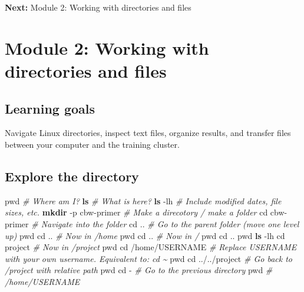 \documentclass[
]{book}
\newenvironment{Shaded}{\begin{snugshade}}{\end{snugshade}}
\newcommand{\AttributeTok}[1]{\textcolor[rgb]{0.13,0.29,0.53}{#1}}
\newcommand{\BuiltInTok}[1]{#1}
\newcommand{\CommentTok}[1]{\textcolor[rgb]{0.56,0.35,0.01}{\textit{#1}}}
\newcommand{\FunctionTok}[1]{\textcolor[rgb]{0.13,0.29,0.53}{\textbf{#1}}}
\newcommand{\NormalTok}[1]{#1}
\begin{document}
\textbf{Next:} Module 2: Working with directories and files

\chapter{Module 2: Working with directories and files}\label{module-2-working-with-directories-and-files}

\section{Learning goals}\label{learning-goals-1}

Navigate Linux directories, inspect text files, organize results, and transfer files between your computer and the training cluster.

\section{Explore the directory}\label{explore-the-directory}

\begin{Shaded}
\begin{Highlighting}[]
\BuiltInTok{pwd}                  \CommentTok{\# Where am I?}
\FunctionTok{ls}                   \CommentTok{\# What is here?}
\FunctionTok{ls} \AttributeTok{{-}lh}               \CommentTok{\# Include modified dates, file sizes, etc.}
\FunctionTok{mkdir} \AttributeTok{{-}p}\NormalTok{ cbw{-}primer  }\CommentTok{\# Make a direcotory / make a folder}
\BuiltInTok{cd}\NormalTok{ cbw{-}primer        }\CommentTok{\# Navigate into the folder}
\BuiltInTok{cd}\NormalTok{ ..                }\CommentTok{\# Go to the parent folder (move one level up)}
\BuiltInTok{pwd}
\BuiltInTok{cd}\NormalTok{ ..                }\CommentTok{\# Now in /home}
\BuiltInTok{pwd}
\BuiltInTok{cd}\NormalTok{ ..                }\CommentTok{\# Now in /}
\BuiltInTok{pwd}
\BuiltInTok{cd}\NormalTok{ ..}
\BuiltInTok{pwd}
\FunctionTok{ls} \AttributeTok{{-}lh}
\BuiltInTok{cd}\NormalTok{ project           }\CommentTok{\# Now in /project}
\BuiltInTok{pwd}
\BuiltInTok{cd}\NormalTok{ /home/USERNAME    }\CommentTok{\# Replace USERNAME with your own username. Equivalent to: cd \textasciitilde{}}
\BuiltInTok{pwd}
\BuiltInTok{cd}\NormalTok{ ../../project     }\CommentTok{\# Go back to /project with relative path}
\BuiltInTok{pwd}
\BuiltInTok{cd} \AttributeTok{{-}}                 \CommentTok{\# Go to the previous directory}
\BuiltInTok{pwd}                  \CommentTok{\# /home/USERNAME}
\end{Highlighting}
\end{Shaded}
\end{document}
